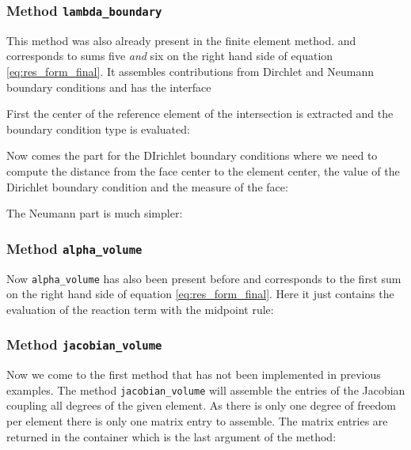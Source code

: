 \documentclass[a4paper,12pt]{article}
\begin{document}
\subsubsection*{Method \lstinline{lambda_boundary}}

This method was also already present in the finite element method.
and corresponds
to sums five \textit{and} six on the right hand side of equation \eqref{eq:res_form_final}.
It assembles contributions from Dirchlet and Neumann
boundary conditions and has the interface


First  the center of the reference element of the intersection
is extracted and the boundary condition type is evaluated:


Now comes the part for the DIrichlet boundary conditions where we
need to compute the distance from the face center to the element center,
the value of the Dirichlet boundary condition and the measure of the face:

The Neumann part is much simpler:


\subsubsection*{Method \lstinline{alpha_volume}}

Now \lstinline{alpha_volume} has also been present before and corresponds
to the first sum on the right hand side of equation \eqref{eq:res_form_final}.
Here it just contains the evaluation of the reaction term 
with the midpoint rule:


\subsubsection*{Method \lstinline{jacobian_volume}}

Now we come to the first method that has not been implemented in
previous examples. The method \lstinline{jacobian_volume}
will assemble the entries of the Jacobian coupling all degrees of
the given element. As there is only one degree of freedom per element there
is only one matrix entry to assemble. The matrix entries are returned
in the container which is the last argument of the method:

\end{document}
